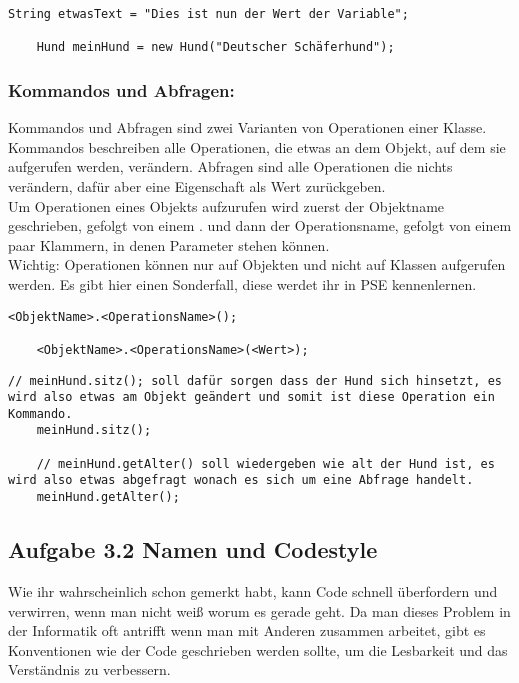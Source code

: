\begin{lstlisting}[title=\textbf{Variable Beispiel}]
	String etwasText = "Dies ist nun der Wert der Variable";
	
	Hund meinHund = new Hund("Deutscher Schäferhund");
\end{lstlisting}
\begin{Infobox}
	\subsubsection*{Kommandos und Abfragen:}
	Kommandos und Abfragen sind zwei Varianten von Operationen einer Klasse. Kommandos beschreiben alle Operationen, die etwas an dem Objekt, auf dem sie aufgerufen werden, verändern.
	Abfragen sind alle Operationen die nichts verändern, dafür aber eine Eigenschaft als Wert zurückgeben.\\
	Um Operationen eines Objekts aufzurufen wird zuerst der Objektname geschrieben, gefolgt von einem . und dann der Operationsname, gefolgt von einem paar Klammern, in denen Parameter stehen können.\\
	{\color{red} Wichtig: } Operationen können nur auf Objekten und nicht auf Klassen aufgerufen werden.
	Es  gibt hier einen Sonderfall, diese werdet ihr in PSE kennenlernen.
\end{Infobox}
\begin{lstlisting}[title=\textbf{Kommando/Abfrage Syntax}]
	<ObjektName>.<OperationsName>();
	
	<ObjektName>.<OperationsName>(<Wert>);
\end{lstlisting}
\newpage
\begin{lstlisting}[title=\textbf{Kommando/Abfrage Beispiel}]
	// meinHund.sitz(); soll dafür sorgen dass der Hund sich hinsetzt, es wird also etwas am Objekt geändert und somit ist diese Operation ein Kommando.
	meinHund.sitz();
	
	// meinHund.getAlter() soll wiedergeben wie alt der Hund ist, es wird also etwas abgefragt wonach es sich um eine Abfrage handelt.
	meinHund.getAlter();
\end{lstlisting}

\subsection*{Aufgabe 3.2 Namen und Codestyle}
Wie ihr wahrscheinlich schon gemerkt habt, kann Code schnell überfordern und verwirren, wenn man nicht weiß worum es gerade geht.
Da man dieses Problem in der Informatik oft antrifft wenn man mit Anderen zusammen arbeitet, gibt es Konventionen wie der Code geschrieben werden sollte, um die Lesbarkeit und das Verständnis zu verbessern.

